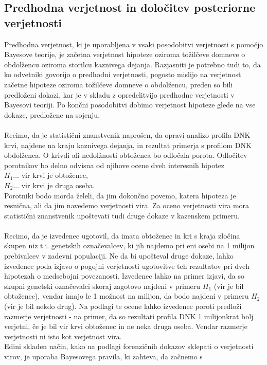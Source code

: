 \documentclass[12pt,a4paper]{amsart}
\theoremstyle{definition} %
\theoremstyle{plain} %
\begin{document}
\subsection{Predhodna verjetnost in določitev posteriorne verjetnosti}
Predhodna verjetnost, ki je uporabljena v vsaki posodobitvi verjetnosti s pomočjo Bayesove teorije, je začetna verjetnost hipoteze oziroma tožilčeve domneve 
o obdolžencu oziroma storilcu kaznivega dejanja. Razjasniti je potrebno tudi to, da ko odvetniki govorijo o predhodni verjetnosti, pogosto mislijo na verjetnost 
začetne hipoteze oziroma tožilčeve domneve o obdolžencu, preden so bili predloženi dokazi, kar je v skladu z opredelitvijo predhodne verjetnosti v Bayesovi 
teoriji. Po končni posodobitvi dobimo verjetnost hipoteze glede na vse dokaze, predložene na sojenju.\\\\
Recimo, da je statistični znanstvenik naprošen, da opravi analizo profila DNK krvi, najdene na kraju kaznivega dejanja, in rezultat primerja s profilom DNK
obdolženca. O krivdi ali nedolžnosti obtoženca bo odločala porota. Odločitev porotnikov bo delno odvisna od njihove ocene dveh interesnih
hipotez\\
$H_1 \dots$ vir krvi je obtoženec,\\
$H_2 \dots$ vir krvi je druga oseba.\\
Porotniki bodo morda želeli, da jim dokončno povemo, katera hipoteza je resnična, ali da jim navedemo verjetnosti vira. Za oceno verjetnosti 
vira mora statistični znanstvenik upoštevati tudi druge dokaze v kazenskem primeru.\\\\
Recimo, da je izvedenec ugotovil, da imata obtoženec in kri s kraja zločina skupen niz t.i. genetskih označevalcev, ki jih najdemo pri eni osebi
na 1 milijon prebivalcev v zadevni populaciji. Ne da bi upošteval druge dokaze, lahko izvedenec poda izjavo o pogojni verjetnosti
ugotovitve teh rezultatov pri dveh hipotezah o medsebojni povezanosti. Izvedenec lahko na primer izjavi, da so skupni genetski označevalci
skoraj zagotovo najdeni v primeru $H_1$ (vir je bil obtoženec), vendar imajo le 1 možnost na milijon, da bodo najdeni v primeru $H_2$ (vir je bil
nekdo drug). Na podlagi te ocene lahko izvedenec poroti predloži razmerje verjetnosti - na primer, da so rezultati profila DNK 1 milijonkrat
bolj verjetni, če je bil vir krvi obtoženec in ne neka druga oseba. Vendar razmerje verjetnosti ni isto kot verjetnost vira. \\
Edini skladen način, kako na podlagi forenzičnih dokazov sklepati o verjetnosti virov, je uporaba Bayesovega pravila, ki zahteva, da začnemo s
\end{document}
